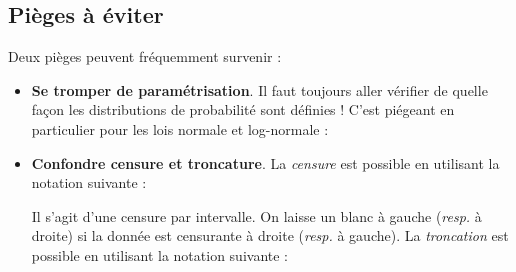 \subsection{Pièges à éviter}

Deux pièges peuvent fréquemment survenir :
\begin{itemize}
    \item {\bf Se tromper de paramétrisation}. Il faut toujours aller vérifier de quelle fa\c con les distributions de probabilité sont définies ! C'est piégeant en particulier pour les lois normale et log-normale :
        \begin{center} 
 \end{center} 
    
    \item {\bf Confondre censure et troncature}. La \emph{censure} est possible en utilisant la notation suivante :
     \begin{center} 
 \end{center} 
    Il s'agit d'une censure par intervalle. On laisse un blanc à gauche ({\it resp.} à droite) si la donnée est censurante à droite ({\it resp.} à gauche). La \emph{troncation} est possible en utilisant la notation suivante :
       \begin{center} 
 \end{center}
\end{itemize}

